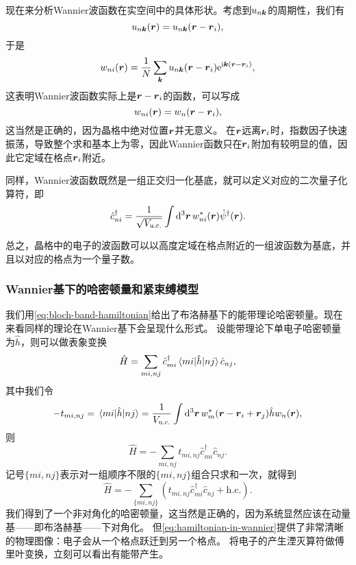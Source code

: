 \documentclass[hyperref, UTF8, a4paper]{ctexart}
\newcommand*{\ii}{\mathrm{i}}
\newcommand*{\ee}{\mathrm{e}}
\begin{document}
现在来分析Wannier波函数在实空间中的具体形状。考虑到$u_{n\vb*{k}}$的周期性，我们有
\[
    u_{n\vb*{k}} (\vb*{r}) = u_{n\vb*{k}} (\vb*{r} - \vb*{r}_i),
\]
于是
\begin{equation}
    w_{ni}(\vb*{r}) = \frac{1}{N} \sum_{\vb*{k}} u_{n\vb*{k}} (\vb*{r} - \vb*{r}_i) \ee^{\ii \vb*{k} (\vb*{r} - \vb*{r}_i)},
\end{equation}
这表明Wannier波函数实际上是$\vb*{r} - \vb*{r}_i$的函数，可以写成
\begin{equation}
    w_{ni}(\vb*{r}) = w_{n}(\vb*{r} - \vb*{r}_i),
\end{equation}
这当然是正确的，因为晶格中绝对位置$\vb*{r}$并无意义。
在$\vb*{r}$远离$\vb*{r}_i$时，指数因子快速振荡，导致整个求和基本上为零，因此Wannier函数只在$\vb*{r}_i$附加有较明显的值，因此它定域在格点$\vb*{r}_i$附近。

同样，Wannier波函数既然是一组正交归一化基底，就可以定义对应的二次量子化算符，即
\begin{equation}
    \hat{c}^\dagger_{ni} = \frac{1}{\sqrt{V_\text{u.c.}}} \int \dd[3]{\vb*{r}} w_{ni}^*(\vb*{r}) \hat{\psi}^\dagger(\vb*{r}).
\end{equation}

总之，晶格中的电子的波函数可以以高度定域在格点附近的一组波函数为基底，并且以对应的格点为一个量子数。

\subsubsection{Wannier基下的哈密顿量和紧束缚模型}

我们用\eqref{eq:bloch-band-hamiltonian}给出了布洛赫基下的能带理论哈密顿量。现在来看同样的理论在Wannier基下会呈现什么形式。
设能带理论下单电子哈密顿量为$\hat{h}$，则可以做表象变换
\[
    \hat{H} = \sum_{mi, nj} \hat{c}^\dagger_{mi} \mel{mi}{\hat{h}}{nj} \hat{c}_{nj},
\]
其中我们令
\begin{equation}
    - t_{mi, nj} = \mel{mi}{\hat{h}}{nj} = \frac{1}{V_\text{u.c.}} \int \dd[3]{\vb*{r}} w_m^*(\vb*{r} - \vb*{r}_i + \vb*{r}_j) \hat{h} w_n(\vb*{r}),
\end{equation}
则
\[
    \hat{H} = - \sum_{mi, nj} t_{mi, nj} \hat{c}^\dagger_{mi} \hat{c}_{nj}.
\]
记号$\{mi, nj\}$表示对一组顺序不限的$\{mi, nj\}$组合只求和一次，就得到
\begin{equation}
    \hat{H} = - \sum_{\{mi, nj\}} (t_{mi, nj} \hat{c}_{mi}^\dagger \hat{c}_{nj} + \text{h.c.}).
    \label{eq:hamiltonian-in-wannier}
\end{equation}
我们得到了一个非对角化的哈密顿量，这当然是正确的，因为系统显然应该在动量基——即布洛赫基——下对角化。
但\eqref{eq:hamiltonian-in-wannier}提供了非常清晰的物理图像：电子会从一个格点跃迁到另一个格点。
将电子的产生湮灭算符做傅里叶变换，立刻可以看出有能带产生。
\end{document}
